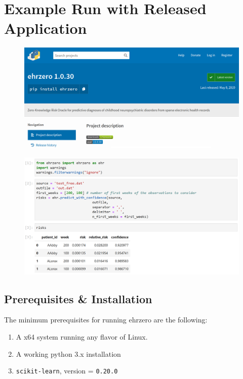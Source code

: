 \section{Example Run with Released  Application}\label{sec:app}

\begin{figure}[!ht]
\centering
\includegraphics[width=.9\textwidth]{Figures/scrn}
\end{figure}

\begin{figure}[!ht]
\centering
\includegraphics[width=.9\textwidth]{Figures/ehrzero_example}
\end{figure}

\subsection{Prerequisites \& Installation}

The minimum prerequisites for running ehrzero are the following:
\begin{enumerate}
\item A x64 system running any flavor of Linux.
\item A working python 3.x installation
\item \texttt{scikit-learn}, version = \texttt{0.20.0}
\end{enumerate}

